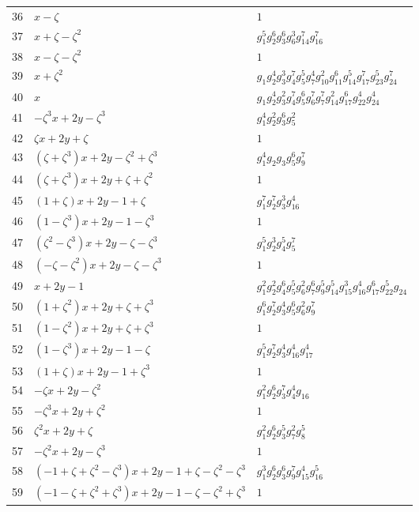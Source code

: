 \documentclass[11pt]{article}
\begin{document}
{\begin{longtable}{@{}rll@{}}
36 & $x-\zeta$ & $1$\\
37 & $x+\zeta-\zeta^2$ & $g_{1}^{5}g_{2}^{6}g_{3}^{6}g_{6}^{3}g_{14}^{7}g_{16}^{7}$\\
38 & $x-\zeta-\zeta^2$ & $1$\\
39 & $x+\zeta^2$ & $g_{1}g_{2}^{4}g_{3}^{3}g_{4}^{7}g_{5}^{5}g_{7}^{4}g_{10}^{2}g_{11}^{6}g_{14}^{5}g_{17}^{7}g_{23}^{5}g_{24}^{7}$\\
40 & $x$ & $g_{1}g_{2}^{4}g_{3}^{2}g_{4}^{7}g_{5}^{6}g_{6}^{7}g_{7}^{7}g_{14}^{2}g_{17}^{6}g_{22}^{4}g_{24}^{4}$\\
41 & $-\zeta^3 x+2 y-\zeta^3$ & $g_{1}^{4}g_{2}^{2}g_{3}^{6}g_{5}^{2}$\\
42 & $\zeta x+2 y+\zeta$ & $1$\\
43 & $(\zeta+\zeta^3)x+2 y-\zeta^2+\zeta^3$ & $g_{1}^{4}g_{2}g_{3}g_{5}^{6}g_{9}^{7}$\\
44 & $(\zeta+\zeta^3)x+2 y+\zeta+\zeta^2$ & $1$\\
45 & $(1+\zeta)x+2 y-1+\zeta$ & $g_{1}^{7}g_{2}^{7}g_{3}^{3}g_{16}^{4}$\\
46 & $(1-\zeta^3)x+2 y-1-\zeta^3$ & $1$\\
47 & $(\zeta^2-\zeta^3)x+2 y-\zeta-\zeta^3$ & $g_{1}^{5}g_{2}^{3}g_{4}^{5}g_{5}^{7}$\\
48 & $(-\zeta-\zeta^2)x+2 y-\zeta-\zeta^3$ & $1$\\
49 & $x+2 y-1$ & $g_{1}^{2}g_{2}^{2}g_{4}^{6}g_{5}^{5}g_{6}^{2}g_{7}^{6}g_{9}^{5}g_{14}^{5}g_{15}^{3}g_{16}^{4}g_{17}^{6}g_{22}^{5}g_{24}$\\
50 & $(1+\zeta^2)x+2 y+\zeta+\zeta^3$ & $g_{1}^{6}g_{2}^{7}g_{3}^{4}g_{5}^{6}g_{6}^{2}g_{9}^{7}$\\
51 & $(1-\zeta^2)x+2 y+\zeta+\zeta^3$ & $1$\\
52 & $(1-\zeta^3)x+2 y-1-\zeta$ & $g_{1}^{5}g_{2}^{7}g_{3}^{4}g_{16}^{4}g_{17}^{4}$\\
53 & $(1+\zeta)x+2 y-1+\zeta^3$ & $1$\\
54 & $-\zeta x+2 y-\zeta^2$ & $g_{1}^{2}g_{2}^{6}g_{3}^{7}g_{4}^{4}g_{16}$\\
55 & $-\zeta^3 x+2 y+\zeta^2$ & $1$\\
56 & $\zeta^2 x+2 y+\zeta$ & $g_{1}^{2}g_{2}^{6}g_{3}^{5}g_{7}^{2}g_{8}^{5}$\\
57 & $-\zeta^2 x+2 y-\zeta^3$ & $1$\\
58 & $(-1+\zeta+\zeta^2-\zeta^3)x+2 y-1+\zeta-\zeta^2-\zeta^3$ & $g_{1}^{3}g_{2}^{6}g_{3}^{6}g_{9}^{7}g_{15}^{4}g_{16}^{5}$\\
59 & $(-1-\zeta+\zeta^2+\zeta^3)x+2 y-1-\zeta-\zeta^2+\zeta^3$ & $1$\\

\end{longtable}}
\end{document}
